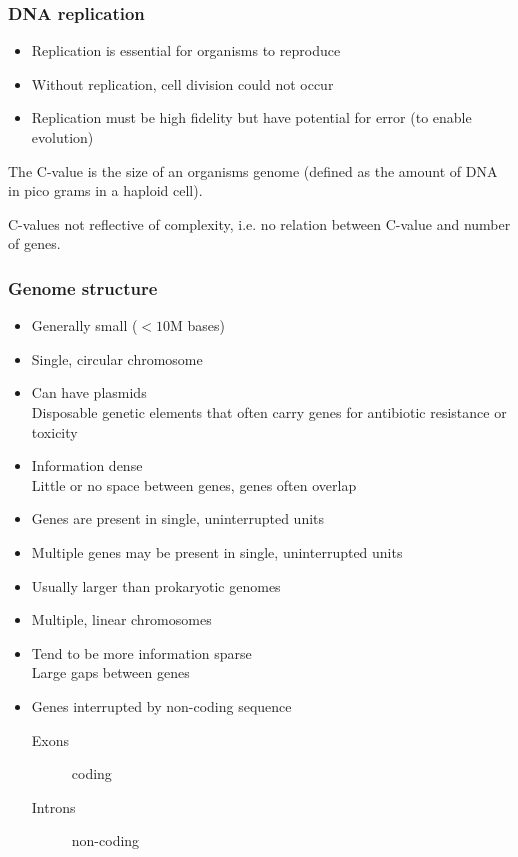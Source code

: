 \documentclass[a4paper]{article}
\begin{document}
\subsubsection{DNA replication}

\begin{itemize}
  \item Replication is essential for organisms to reproduce
  \item Without replication, cell division could not occur
  \item Replication must be high fidelity but have potential for error (to
        enable evolution)
\end{itemize}


The C-value is the size of an organisms genome (defined as the amount of DNA in
pico grams in a haploid cell).

C-values not reflective of complexity, i.e. no relation between C-value and
number of genes.

\subsubsection{Genome structure}


\begin{itemize}
  \item Generally small ($<10 \mathrm{M}$ bases)
  \item Single, circular chromosome
  \item Can have plasmids \\
        Disposable genetic elements that often carry genes for antibiotic
        resistance or toxicity
  \item Information dense \\
        Little or no space between genes, genes often overlap
  \item Genes are present in single, uninterrupted units
  \item Multiple genes may be present in single, uninterrupted units
\end{itemize}


\begin{itemize}
  \item Usually larger than prokaryotic genomes
  \item Multiple, linear chromosomes
  \item Tend to be more information sparse \\
        Large gaps between genes
  \item Genes interrupted by non-coding sequence
    \begin{description}
      \item[Exons] coding
      \item[Introns] non-coding
    \end{description}
\end{itemize}
\end{document}
